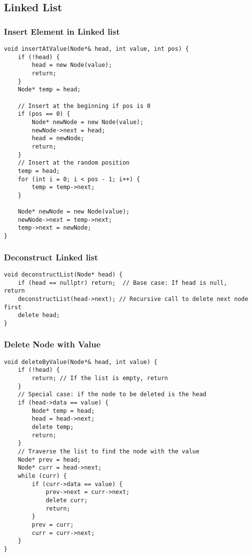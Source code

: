 \subsection{Linked List}
\subsubsection{Insert Element in Linked list}
\begin{lstlisting}[style = codeexpert]
void insertAtValue(Node*& head, int value, int pos) {
    if (!head) {
        head = new Node(value);
        return;
    }
    Node* temp = head;

    // Insert at the beginning if pos is 0
    if (pos == 0) {
        Node* newNode = new Node(value);
        newNode->next = head;
        head = newNode;
        return;
    }
    // Insert at the random position
    temp = head;
    for (int i = 0; i < pos - 1; i++) {
        temp = temp->next;
    }
    
    Node* newNode = new Node(value);
    newNode->next = temp->next;
    temp->next = newNode;
}
\end{lstlisting}
\columnbreak
\subsubsection{Deconstruct Linked list}
\begin{lstlisting}[style = codeexpert]
void deconstructList(Node* head) {
    if (head == nullptr) return;  // Base case: If head is null, return
    deconstructList(head->next); // Recursive call to delete next node first
    delete head;
}
\end{lstlisting}

\subsubsection{Delete Node with Value}
\begin{lstlisting}[style = codeexpert]
void deleteByValue(Node*& head, int value) {
    if (!head) {
        return; // If the list is empty, return
    }
    // Special case: if the node to be deleted is the head
    if (head->data == value) {
        Node* temp = head;
        head = head->next;
        delete temp;
        return;
    }
    // Traverse the list to find the node with the value
    Node* prev = head;
    Node* curr = head->next;
    while (curr) {
        if (curr->data == value) {
            prev->next = curr->next;
            delete curr;
            return;
        }
        prev = curr;
        curr = curr->next;
    }
}
\end{lstlisting}

